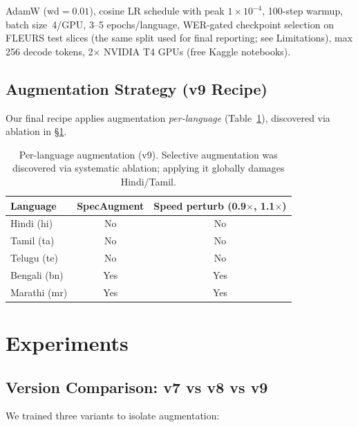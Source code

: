 \documentclass[11pt,a4paper]{article}
\begin{document}
AdamW ($\text{wd}=0.01$), cosine LR schedule with peak $1\times10^{-4}$, 100-step warmup, batch size~4/GPU, 3--5 epochs/language, WER-gated checkpoint selection on FLEURS test slices (the same split used for final reporting; see Limitations), max 256 decode tokens, 2$\times$ NVIDIA T4 GPUs (free Kaggle notebooks).

\subsection{Augmentation Strategy (v9 Recipe)}

Our final recipe applies augmentation \emph{per-language} (Table~\ref{tab:aug}), discovered via ablation in \S\ref{sec:experiments}.

\begin{table}[t]
  \centering
  \caption{Per-language augmentation (v9). Selective augmentation was discovered via systematic ablation; applying it globally damages Hindi/Tamil.}
  \label{tab:aug}
  \begin{tabular}{lcc}
    \toprule
    Language & SpecAugment & Speed perturb (0.9$\times$, 1.1$\times$) \\
    \midrule
    Hindi (hi)  & No  & No  \\
    Tamil (ta)  & No  & No  \\
    Telugu (te) & No  & No  \\
    Bengali (bn)& Yes & Yes \\
    Marathi (mr)& Yes & Yes \\
    \bottomrule
  \end{tabular}
\end{table}

\section{Experiments}
\label{sec:experiments}

\subsection{Version Comparison: v7 vs v8 vs v9}

We trained three variants to isolate augmentation:
\end{document}
